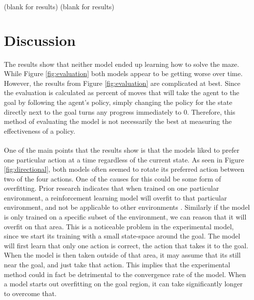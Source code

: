 \documentclass[12pt]{article}
\begin{document}
\newpage
(blank for results)
\newpage
(blank for results)
\newpage

\section{Discussion}

% 


\paragraph{}
The results show that neither model ended up learning how to solve the maze. 
While Figure \ref{fig:evaluation} both models appear to be getting worse over time.
However, the results from Figure \ref{fig:evaluation} are complicated at best.
Since the evaluation is calculated as percent of moves that will take the agent to the goal by following the agent's policy, simply changing the policy for the state directly next to the goal turns any progress immediately to 0.
Therefore, this method of evaluating the model is not necessarily the best at measuring the effectiveness of a policy.

\paragraph{}
One of the main points that the results show is that the models liked to prefer one particular action at a time regardless of the current state.
As seen in Figure \ref{fig:directional}, both models often seemed to rotate its preferred action between two of the four actions. %
One of the causes for this could be some form of overfitting.
Prior research indicates that when trained on one particular environment, a reinforcement learning model will overfit to that particular environment, and not be applicable to other environments \cite{article_overfitting_neural_networks}.
Similarly if the model is only trained on a specific subset of the environment, we can reason that it will overfit on that area.
This is a noticeable problem in the experimental model, since we start its training with a small state-space around the goal.
The model will first learn that only one action is correct, the action that takes it to the goal.
When the model is then taken outside of that area, it may assume that its still near the goal, and just take that action.
This implies that the experimental method could in fact be detrimental to the convergence rate of the model.
When a model starts out overfitting on the goal region, it can take significantly longer to overcome that.
\end{document}
